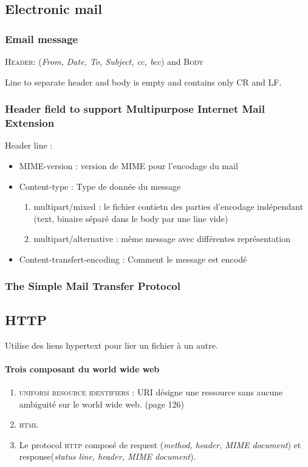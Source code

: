 \subsection{Electronic mail}

\subsubsection{Email message}
\textsc{Header:} (\textit{From, Date, To, Subject,  cc, bcc}) and \textsc{Body}

Line to separate header and body is empty and contains only CR and LF.

\subsubsection{Header field to support Multipurpose Internet Mail Extension}
Header line :
\begin{itemize}
    \item MIME-version : version de MIME pour l'encodage du mail
    \item Content-type : Type de donnée du message
        \begin{enumerate}
            \item multipart/mixed : le fichier contietn des parties d'encodage
                indépendant (text, binaire séparé dans le body par une line vide)
            \item multipart/alternative : même message avec différentes représentation
        \end{enumerate}
    \item Content-transfert-encoding : Comment le message est encodé
\end{itemize}

\subsubsection{The Simple Mail Transfer Protocol}

\subsection{HTTP}
Utilise des liens hypertext pour lier un fichier à un autre.

\paragraph{Trois composant du world wide web}
\begin{enumerate}
    \item \textsc{uniform resource identifiers} : URI désigne une ressource sans aucune ambiguité
sur le world wide web. (page 126)
    \item \textsc{html}
    \item Le protocol \textsc{http} composé de request (\textit{method, header, MIME document}) et response(\textit{status line, header, MIME document}).
\end{enumerate}

